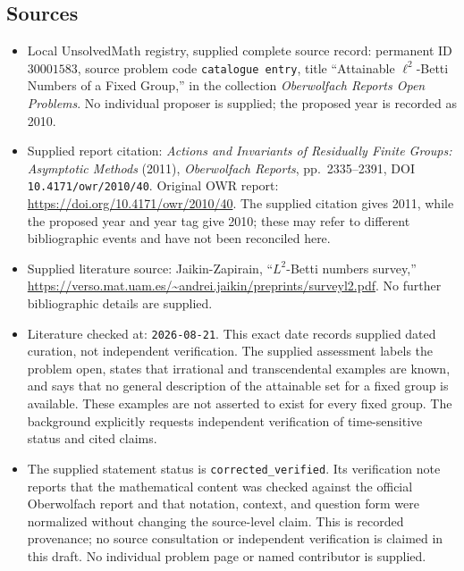 \documentclass[11pt]{article}
\begin{document}
\subsection{Sources}
\begin{itemize}
\item Local UnsolvedMath registry, supplied complete source record: permanent ID \(30001583\), source problem code \texttt{catalogue entry}, title ``Attainable \(\ell^2\)-Betti Numbers of a Fixed Group,'' in the collection \emph{Oberwolfach Reports Open Problems}. No individual proposer is supplied; the proposed year is recorded as 2010.
\item Supplied report citation: \emph{Actions and Invariants of Residually Finite Groups: Asymptotic Methods} (2011), \emph{Oberwolfach Reports}, pp.\ 2335--2391, DOI \texttt{10.4171/owr/2010/40}. Original OWR report: \url{https://doi.org/10.4171/owr/2010/40}. The supplied citation gives 2011, while the proposed year and year tag give 2010; these may refer to different bibliographic events and have not been reconciled here.
\item Supplied literature source: Jaikin-Zapirain, ``\(L^2\)-Betti numbers survey,'' \url{https://verso.mat.uam.es/~andrei.jaikin/preprints/surveyl2.pdf}. No further bibliographic details are supplied.
\item Literature checked at: \texttt{2026-08-21}. This exact date records supplied dated curation, not independent verification. The supplied assessment labels the problem open, states that irrational and transcendental examples are known, and says that no general description of the attainable set for a fixed group is available. These examples are not asserted to exist for every fixed group. The background explicitly requests independent verification of time-sensitive status and cited claims.
\item The supplied statement status is \texttt{corrected\_verified}. Its verification note reports that the mathematical content was checked against the official Oberwolfach report and that notation, context, and question form were normalized without changing the source-level claim. This is recorded provenance; no source consultation or independent verification is claimed in this draft. No individual problem page or named contributor is supplied.
\end{itemize}
\end{document}
